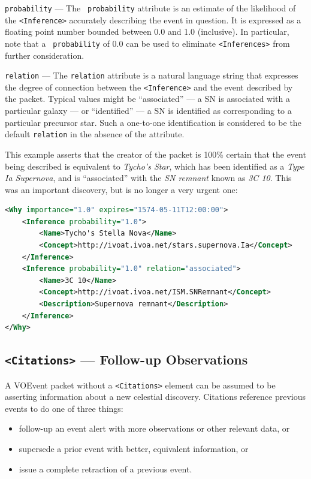 \documentclass[11pt,a4paper]{ivoa}
\begin{document}
 {\tt probability}\label{sec:3.6.6.1} --- The {\tt 
probability} attribute is an estimate of the likelihood of the {\tt <Inference>}
accurately describing the event in question. It is expressed as a floating point
number bounded between 0.0 and 1.0 (inclusive). In particular, note that a {\tt
probability} of 0.0 can be used to eliminate {\tt <Inferences>} from further 
consideration. 

 {\tt relation}\label{sec:3.6.6.2} --- The {\tt relation}
attribute is a natural language string that expresses the degree of connection 
between the {\tt <Inference>} and the event described by the packet. Typical 
values might be ``associated'' --- a SN is associated with a particular galaxy 
--- or ``identified'' --- a SN is identified as corresponding to a particular 
precursor star. Such a one-to-one identification is considered to be the default
{\tt relation} in the absence of the attribute. 

This example asserts that the creator of the packet is 100\% certain that the 
event being described is equivalent to \emph{Tycho's Star}, which has been 
identified as a \emph{Type Ia Supernova}, and is ``associated'' with the 
\emph{SN remnant} known as \emph{3C 10}. This was an important discovery, but 
is no longer a very urgent one: 
\begin{lstlisting}[language=XML]
<Why importance="1.0" expires="1574-05-11T12:00:00">
    <Inference probability="1.0">
        <Name>Tycho's Stella Nova</Name>
        <Concept>http://ivoat.ivoa.net/stars.supernova.Ia</Concept>
    </Inference>     
    <Inference probability="1.0" relation="associated">
        <Name>3C 10</Name>
        <Concept>http://ivoat.ivoa.net/ISM.SNRemnant</Concept>
        <Description>Supernova remnant</Description>
    </Inference>
</Why> 
\end{lstlisting}

\subsection{{\tt <Citations>} --- Follow-up Observations}
\label{sec:3.7}
A VOEvent packet without a {\tt <Citations>} element can be assumed to be 
asserting information about a new celestial discovery. Citations reference 
previous events to do one of three things: 
\begin{itemize}
\item follow-up an event alert with more observations or other relevant data, or
\item supersede a prior event with better, equivalent information, or
\item issue a complete retraction of a previous event.
\end{itemize}
\end{document}
